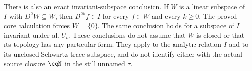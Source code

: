 There is also an exact invariant-subspace conclusion.
If $W$ is a linear subspace of $I$ with $D^2W\subseteq W$,
then $D^{2k}f\in I$ for every $f\in W$ and every $k\geq0$.
The proved core calculation forces $W=\{0\}$.
The same conclusion holds for a subspace of $I$ invariant
under all $U_t$. These conclusions do not assume that $W$
is closed or that its topology has any particular form.
They apply to the analytic relation $I$ and to its unclosed
Schwartz trace subspace, and do not identify either with
the actual source closure $\cqN$ in the still unnamed $\tau$.
